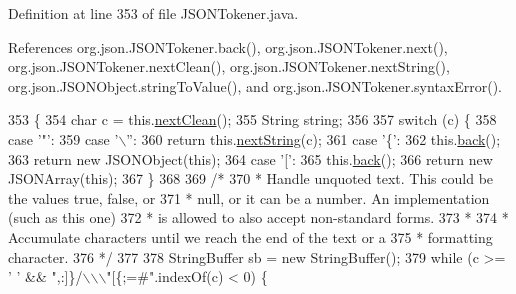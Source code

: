 Definition at line 353 of file J\-S\-O\-N\-Tokener.\-java.



References org.\-json.\-J\-S\-O\-N\-Tokener.\-back(), org.\-json.\-J\-S\-O\-N\-Tokener.\-next(), org.\-json.\-J\-S\-O\-N\-Tokener.\-next\-Clean(), org.\-json.\-J\-S\-O\-N\-Tokener.\-next\-String(), org.\-json.\-J\-S\-O\-N\-Object.\-string\-To\-Value(), and org.\-json.\-J\-S\-O\-N\-Tokener.\-syntax\-Error().


\begin{DoxyCode}
353                                                    \{
354         \textcolor{keywordtype}{char} c = this.\hyperlink{classorg_1_1json_1_1_j_s_o_n_tokener_ad675aa7419ea153d54a72e1fced1e08f}{nextClean}();
355         String string;
356 
357         \textcolor{keywordflow}{switch} (c) \{
358             \textcolor{keywordflow}{case} \textcolor{charliteral}{'"'}:
359             \textcolor{keywordflow}{case} \textcolor{charliteral}{'\(\backslash\)''}:
360                 \textcolor{keywordflow}{return} this.\hyperlink{classorg_1_1json_1_1_j_s_o_n_tokener_af5622e7beb53a5290a7e18f8b8111ee5}{nextString}(c);
361             \textcolor{keywordflow}{case} \textcolor{charliteral}{'\{'}:
362                 this.\hyperlink{classorg_1_1json_1_1_j_s_o_n_tokener_aa2eafdef7304777a457f3e66cc0e668b}{back}();
363                 \textcolor{keywordflow}{return} \textcolor{keyword}{new} JSONObject(\textcolor{keyword}{this});
364             \textcolor{keywordflow}{case} \textcolor{charliteral}{'['}:
365                 this.\hyperlink{classorg_1_1json_1_1_j_s_o_n_tokener_aa2eafdef7304777a457f3e66cc0e668b}{back}();
366                 \textcolor{keywordflow}{return} \textcolor{keyword}{new} JSONArray(\textcolor{keyword}{this});
367         \}
368 
369         \textcolor{comment}{/*}
370 \textcolor{comment}{         * Handle unquoted text. This could be the values true, false, or}
371 \textcolor{comment}{         * null, or it can be a number. An implementation (such as this one)}
372 \textcolor{comment}{         * is allowed to also accept non-standard forms.}
373 \textcolor{comment}{         *}
374 \textcolor{comment}{         * Accumulate characters until we reach the end of the text or a}
375 \textcolor{comment}{         * formatting character.}
376 \textcolor{comment}{         */}
377 
378         StringBuffer sb = \textcolor{keyword}{new} StringBuffer();
379         \textcolor{keywordflow}{while} (c >= \textcolor{charliteral}{' '} && \textcolor{stringliteral}{",:]\}/\(\backslash\)\(\backslash\)\(\backslash\)"[\{;=#"}.indexOf(c) < 0) \{

\end{DoxyCode}
